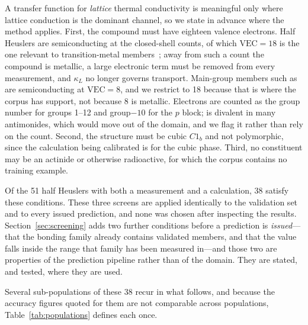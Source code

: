 A transfer function for \emph{lattice} thermal conductivity is meaningful only where lattice
conduction is the dominant channel, so we state in advance where the method applies. First, the
compound must have eighteen valence electrons. Half Heuslers are semiconducting at the closed-shell
counts, of which $\mathrm{VEC}=18$ is the one relevant to transition-metal
members~\cite{graf2011simple,anand2018a}; away from such a count the compound is metallic, a large
electronic term must be removed from every measurement, and $\kappa_L$ no longer governs transport.
Main-group members such as  are semiconducting at $\mathrm{VEC}=8$, and we restrict to
18 because that is where the corpus has support, not because 8 is metallic. Electrons are counted
as the group number for groups 1--12 and group$-10$ for the $p$ block;  is divalent in many
antimonides, which would move  out of the domain, and we flag it rather than rely on the
count. Second, the structure must be cubic $C1_b$ and not polymorphic, since the calculation being
calibrated is for the cubic phase. Third, no constituent may be an actinide or otherwise
radioactive, for which the corpus contains no training example.

Of the \num{51} half Heuslers with both a measurement and a calculation, \num{38} satisfy these
conditions. These three screens are applied identically to the validation set and to every issued
prediction, and none was chosen after inspecting the results. Section~\ref{sec:screening} adds two
further conditions before a prediction is \emph{issued}---that the bonding family already contains
validated members, and that the value falls inside the range that family has been measured in---and
those two are properties of the prediction pipeline rather than of the domain. They are stated, and
tested, where they are used.

Several sub-populations of these \num{38} recur in what follows, and because the accuracy figures
quoted for them are not comparable across populations, Table~\ref{tab:populations} defines each
once.

